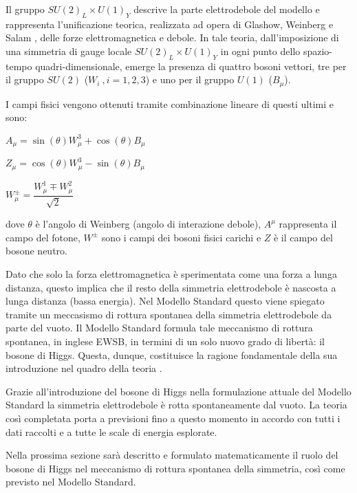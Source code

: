 \bigskip
Il gruppo $SU(2)_{L}\times U(1)_{Y}$ descrive la parte elettrodebole del modello e rappresenta l'unificazione teorica, realizzata ad opera
di Glashow, Weinberg e Salam \cite{salam}, delle forze elettromagnetica e debole.
In tale teoria, dall’imposizione di una simmetria di gauge locale $SU(2)_{L}\times U(1)_{Y}$ in ogni punto dello spazio-tempo 
quadri-dimensionale, emerge la presenza di quattro bosoni vettori, tre per il gruppo $SU(2)$ ($W_i ~,i=1,2,3$) e uno per il
gruppo $U(1)$ ($B_{\mu}$).

I campi fisici
vengono ottenuti tramite combinazione lineare di questi ultimi e sono:
\begin{center}
 $A_{\mu}=\sin(\theta)W_{\mu}^{3}+\cos(\theta)B_{\mu}$
\end{center}
\begin{center}
 $Z_{\mu}=\cos(\theta)W_{\mu}^{3} -\sin(\theta)B_{\mu}$
\end{center}
\begin{center}
 $W_{\mu}^{\pm}=\dfrac{W_{\mu}^{1}\mp W^{2}_{\mu}}{\sqrt{2}}$
\end{center}

dove $\theta$ è l'angolo di Weinberg (angolo di interazione debole), $A^{\mu}$ rappresenta il campo del fotone, $W^{\pm}$
sono i campi dei bosoni fisici carichi e $Z$ è il campo del bosone neutro.

\medskip
Dato che solo la forza elettromagnetica è sperimentata come una forza a lunga distanza, questo implica che il resto della simmetria elettrodebole
è nascosta a lunga distanza (bassa energia). Nel Modello Standard questo viene spiegato tramite un meccasismo di rottura spontanea della simmetria elettrodebole da parte del vuoto.
Il Modello Standard formula tale meccanismo di rottura spontanea, in inglese \ac{EWSB}, in termini di un solo
nuovo grado di libertà: il bosone di Higgs. Questa, dunque, costituisce la ragione fondamentale della sua introduzione nel quadro della teoria
\cite{rottura}.

\medskip
Grazie all'introduzione del bosone di Higgs nella formulazione attuale del Modello Standard
la simmetria elettrodebole è rotta spontaneamente dal vuoto. La teoria così completata porta a previsioni fino a questo momento 
in accordo con tutti i dati raccolti e a tutte le scale di energia esplorate.

\medskip
Nella prossima sezione sarà descritto e formulato matematicamente il ruolo del bosone di Higgs nel meccanismo di rottura spontanea
della simmetria, così come previsto nel Modello Standard.

